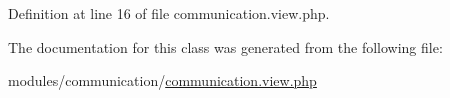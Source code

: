 Definition at line 16 of file communication.\-view.\-php.



The documentation for this class was generated from the following file\-:\begin{DoxyCompactItemize}
\item 
modules/communication/\hyperlink{communication_8view_8php}{communication.\-view.\-php}\end{DoxyCompactItemize}
